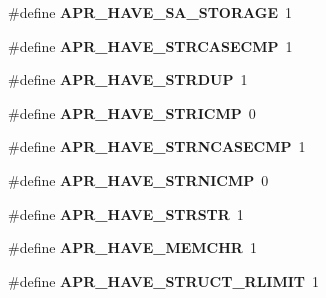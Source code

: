 \begin{DoxyCompactItemize}
\item 
\hypertarget{group__apr__platform_ga57c4c6c8a22aeef21db29093f2f648f9}{\#define {\bfseries A\-P\-R\-\_\-\-H\-A\-V\-E\-\_\-\-S\-A\-\_\-\-S\-T\-O\-R\-A\-G\-E}~1}\label{group__apr__platform_ga57c4c6c8a22aeef21db29093f2f648f9}

\item 
\hypertarget{group__apr__platform_ga4da5b6343c5b896efb3695c94f8dd374}{\#define {\bfseries A\-P\-R\-\_\-\-H\-A\-V\-E\-\_\-\-S\-T\-R\-C\-A\-S\-E\-C\-M\-P}~1}\label{group__apr__platform_ga4da5b6343c5b896efb3695c94f8dd374}

\item 
\hypertarget{group__apr__platform_ga73cf943f6399274e71979e902b3030a0}{\#define {\bfseries A\-P\-R\-\_\-\-H\-A\-V\-E\-\_\-\-S\-T\-R\-D\-U\-P}~1}\label{group__apr__platform_ga73cf943f6399274e71979e902b3030a0}

\item 
\hypertarget{group__apr__platform_ga07a4215d05bb012f8ff9c4c681b2f9a3}{\#define {\bfseries A\-P\-R\-\_\-\-H\-A\-V\-E\-\_\-\-S\-T\-R\-I\-C\-M\-P}~0}\label{group__apr__platform_ga07a4215d05bb012f8ff9c4c681b2f9a3}

\item 
\hypertarget{group__apr__platform_ga8f45d52206b5d6ee37dc05e53d9bd93c}{\#define {\bfseries A\-P\-R\-\_\-\-H\-A\-V\-E\-\_\-\-S\-T\-R\-N\-C\-A\-S\-E\-C\-M\-P}~1}\label{group__apr__platform_ga8f45d52206b5d6ee37dc05e53d9bd93c}

\item 
\hypertarget{group__apr__platform_gadc5209ed6b80ac6734ce2a13a3a2273d}{\#define {\bfseries A\-P\-R\-\_\-\-H\-A\-V\-E\-\_\-\-S\-T\-R\-N\-I\-C\-M\-P}~0}\label{group__apr__platform_gadc5209ed6b80ac6734ce2a13a3a2273d}

\item 
\hypertarget{group__apr__platform_ga2850a7c280e08a629d2b0bc2eeb97b41}{\#define {\bfseries A\-P\-R\-\_\-\-H\-A\-V\-E\-\_\-\-S\-T\-R\-S\-T\-R}~1}\label{group__apr__platform_ga2850a7c280e08a629d2b0bc2eeb97b41}

\item 
\hypertarget{group__apr__platform_ga510e98c8dd8ef45a6c902b8daaedc3a4}{\#define {\bfseries A\-P\-R\-\_\-\-H\-A\-V\-E\-\_\-\-M\-E\-M\-C\-H\-R}~1}\label{group__apr__platform_ga510e98c8dd8ef45a6c902b8daaedc3a4}

\item 
\hypertarget{group__apr__platform_ga2519340ecb3c313c81d36d70335430f9}{\#define {\bfseries A\-P\-R\-\_\-\-H\-A\-V\-E\-\_\-\-S\-T\-R\-U\-C\-T\-\_\-\-R\-L\-I\-M\-I\-T}~1}\label{group__apr__platform_ga2519340ecb3c313c81d36d70335430f9}


\end{DoxyCompactItemize}
